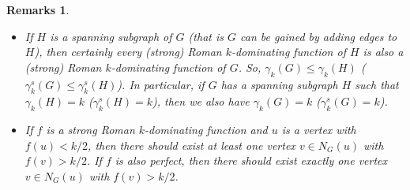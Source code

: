 \documentclass[12pt]{amsart}
\newtheorem{remarks}[theorem]{Remarks}
\begin{document}
\begin{remarks}
\begin{itemize}
\item[7)] If $H$ is a spanning subgraph of $G$ (that is $G$ can be gained by adding edges to $H$), then certainly every (strong) Roman $k$-dominating function of $H$ is also a (strong) Roman $k$-dominating function of $G$. So, $\gamma_k(G) \leq \gamma_k(H)$ ($\gamma^s_k(G) \leq \gamma^s_k(H)$). In particular, if $G$ has a spanning subgraph $H$ such that $\gamma_k(H)=k$ ($\gamma^s_k(H)=k$), then we also have $\gamma_k(G)=k$ ($\gamma^s_k(G)=k$).

\item[8)] If $f$ is a strong Roman $k$-dominating function and $u$ is a vertex with $f(u)<k/2$, then there should exist at least one vertex $v\in N_G(u)$ with $f(v)>k/2$. If $f$ is also perfect, then there should exist exactly one vertex $v\in N_G(u)$ with $f(v)>k/2$.
\end{itemize}
\end{remarks}
\end{document}
